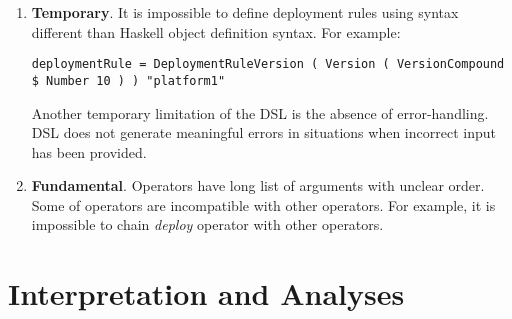 \documentclass[11pt]{article}
\def\denseitems{
    \itemsep1pt plus1pt minus1pt
    \parsep0pt plus0pt
    \parskip0pt\topsep0pt}
\newcommand{\RevisionNeeded}{\bigskip\noindent\fbox{
\textbf{Be prepared to revise this section \emph{many} times!}}}
\newcommand{\prog}[1]{{\small\texttt{#1}}}
\begin{document}
%



\begin{enumerate}[(1)]\denseitems
\item \textbf{Temporary}. It is impossible to define deployment rules using syntax different than Haskell object definition syntax. For example: 
\begin{lstlisting}[style=Haskell]
deploymentRule = DeploymentRuleVersion ( Version ( VersionCompound $ Number 10 ) ) "platform1" 
\end{lstlisting}
Another temporary limitation of the DSL is the absence of error-handling. DSL does not generate meaningful errors in situations when incorrect input has been provided. 
\item \textbf{Fundamental}. Operators have long list of arguments with unclear order. Some of operators are incompatible with other operators. For example, it is impossible to chain \emph{deploy} operator with other operators. 
\end{enumerate}


%
%




\section{Interpretation and Analyses}
\label{sec:analysis}
\end{document}

